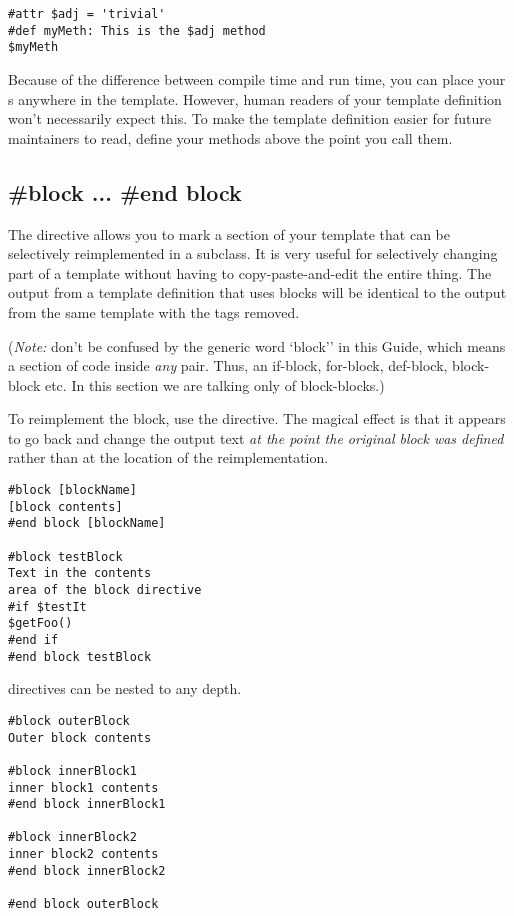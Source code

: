 \begin{verbatim}
#attr $adj = 'trivial'
#def myMeth: This is the $adj method 
$myMeth
\end{verbatim}

Because of the difference between compile time and run time, you can place
your s anywhere in the template.  However, human readers of your
template definition won't necessarily expect this.  To make the template
definition easier for future maintainers to read, define your methods above
the point you call them.


\subsection{\#block ... \#end block}
\label{inheritanceEtc.block}


The  directive allows you to mark a section of your template that
can be selectively reimplemented in a subclass.  It is very useful for
selectively changing part of a template without having to copy-paste-and-edit
the entire thing.  The output from a template definition that uses blocks will
be identical to the output from the same template with the  tags removed. 

({\em Note:} don't be confused by the generic word `block'' in this Guide,
which means a section of code inside {\em any} 
pair.  Thus, an if-block, for-block, def-block, block-block etc.  In this
section we are talking only of block-blocks.)

To reimplement the block, use the  directive.  The magical effect
is that it appears to go back and change the output text {\em at the point the
original block was defined} rather than at the location of the
reimplementation.

\begin{verbatim}
#block [blockName] 
[block contents] 
#end block [blockName]

#block testBlock
Text in the contents 
area of the block directive
#if $testIt
$getFoo() 
#end if
#end block testBlock
\end{verbatim}


 directives can be nested to any depth.

\begin{verbatim}
#block outerBlock
Outer block contents 

#block innerBlock1
inner block1 contents 
#end block innerBlock1

#block innerBlock2
inner block2 contents 
#end block innerBlock2

#end block outerBlock
\end{verbatim}

